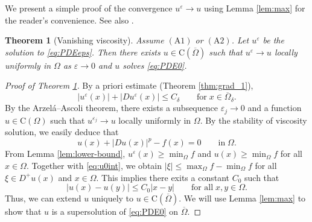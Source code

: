 \documentclass[12pt,reqno]{amsart}
\numberwithin{figure}{section}
\theoremstyle{plain}
\newtheorem{thm}{Theorem}[section]
\theoremstyle{remark}
\numberwithin{equation}{section}
\newcommand{\rmC}{\mathrm{C}}
\begin{document}
We present a simple proof of the convergence $u^\varepsilon \to u$ using Lemma \ref{lem:max} for the reader's convenience. See also \cite[Theorem VII.3]{Capuzzo-Dolcetta1990}.
\begin{thm}[Vanishing viscosity]\label{thm:qual} Assume $\mathrm{(A1)}$ or $\mathrm{(A2)}$. Let $u^\varepsilon$ be the solution to \eqref{eq:PDEeps}. Then there exists $u \in \mathrm{C}(\overline{\Omega})$ such that $u^\varepsilon \rightarrow u$ locally uniformly in $\Omega$ as $\varepsilon\rightarrow 0$ and $u$ solves \eqref{eq:PDE0}.
\end{thm}

\begin{proof}[Proof of Theorem \ref{thm:qual}] By a priori estimate (Theorem \ref{thm:grad_1}), 
\begin{equation}\label{e:priorie_eps}
    |u^\varepsilon(x)| + |Du^\varepsilon(x)| \leq C_\delta \qquad\text{for}\;x\in \overline{\Omega}_\delta.
\end{equation}
By the Arzel\'a--Ascoli theorem, there exists a subsequence $\varepsilon_j\to 0$ and a function $u\in \rmC(\Omega)$ such that $u^{\varepsilon_j}\to u$ locally uniformly in $\Omega$. By the stability of viscosity solution, we easily deduce that 
\begin{equation}\label{eq:u0int}
     u(x) + |Du(x)|^p - f(x) = 0 \qquad\text{in}\;\Omega.
\end{equation}
From Lemma \ref{lem:lower-bound}, $  u^\varepsilon(x)\geq \min_{\Omega} f$ and  $  u(x)\geq \min_{\Omega} f$ for all $x\in \Omega$. Together with \eqref{eq:u0int}, we obtain $|\xi|\leq \max_\Omega f - \min_\Omega f$ for all $\xi\in D^+u(x)$ and $x\in \Omega$. This implies there exits a constant $C_0$ such that
\begin{equation}\label{e:C0}
    |u(x) - u(y)| \leq C_0|x-y| \qquad\text{for all}\;x,y\in \Omega.
\end{equation}
Thus, we can extend $u$ uniquely to $u\in \rmC(\overline{\Omega})$. We will use Lemma \ref{lem:max} to show that $u$ is a supersolution of \eqref{eq:PDE0} on $\overline{\Omega}$.


\end{proof}
\end{document}
